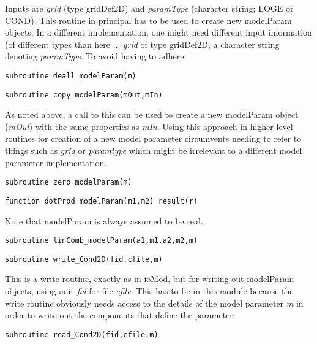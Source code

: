 \documentclass[12pt]{article}
\begin{document}
Inputs are {\it grid} (type gridDef2D) and {\it paramType}
(character string; LOGE or COND).
This routine in principal has to be used to create
new modelParam objects.  In a different implementation,
one might need different input information (of different
types than here ... {\it grid} of type gridDef2D,  a character
string denoting {\it paramType}.  To avoid having to adhere

\begin{verbatim}
subroutine deall_modelParam(m)
\end{verbatim}

\begin{verbatim}
subroutine copy_modelParam(mOut,mIn)
\end{verbatim}

As noted above, a call to this can be used to create a new
modelParam object ({\it mOut}) with the same properties as 
{\it mIn}.  Using this approach in higher level routines for creation 
of a new model parameter
circumvents needing to refer to things such as
{\it grid} or {\it paramtype}
which might be irrelevant to a different model parameter implementation.

\begin{verbatim}
subroutine zero_modelParam(m)
\end{verbatim}

\begin{verbatim}
function dotProd_modelParam(m1,m2) result(r)
\end{verbatim}

Note that modelParam is always assumed to be real.

\begin{verbatim}
subroutine linComb_modelParam(a1,m1,a2,m2,m)
\end{verbatim}

\begin{verbatim}
subroutine write_Cond2D(fid,cfile,m)
\end{verbatim}

This is a write routine, exactly as in ioMod, but for
writing out modelParam objects, using unit {\it fid} for file {\it cfile}.
This has to be in this module because the write routine obviously needs
access to the details of the model parameter {\it m}
in order to write out the components that define the parameter.

\begin{verbatim}
subroutine read_Cond2D(fid,cfile,m)
\end{verbatim}
\end{document}
